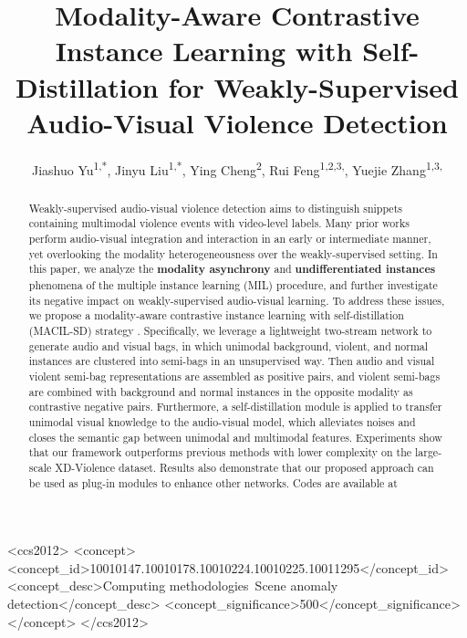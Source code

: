 \documentclass[sigconf]{acmart}
\begin{document}
\title{Modality-Aware Contrastive Instance Learning with Self-Distillation for Weakly-Supervised Audio-Visual Violence Detection}

\author{Jiashuo Yu\textsuperscript{1,*}\authornotemark[1], Jinyu Liu\textsuperscript{1,*}\authornotemark[1], Ying Cheng\textsuperscript{2}, Rui Feng\textsuperscript{1,2,3,}\authornotemark[2], Yuejie Zhang\textsuperscript{1,3,}\authornotemark[2]}



\begin{abstract}
Weakly-supervised audio-visual violence detection aims to distinguish snippets containing multimodal violence events with video-level labels. Many prior works perform audio-visual integration and interaction in an early or intermediate manner, yet overlooking the modality heterogeneousness over the weakly-supervised setting. In this paper, we analyze the \textbf{modality asynchrony} and \textbf{undifferentiated instances} phenomena of the multiple instance learning (MIL) procedure, and further investigate its negative impact on weakly-supervised audio-visual learning. To address these issues, we propose a modality-aware contrastive instance learning with self-distillation (MACIL-SD) strategy . Specifically, we leverage a lightweight two-stream network to generate audio and visual bags, in which unimodal background, violent, and normal instances are clustered into semi-bags in an unsupervised way. Then audio and visual violent semi-bag representations are assembled as positive pairs, and violent semi-bags are combined with background and normal instances in the opposite modality as contrastive negative pairs. Furthermore, a self-distillation module is applied to transfer unimodal visual knowledge to the audio-visual model, which alleviates noises and closes the semantic gap between unimodal and multimodal features. Experiments show that our framework outperforms previous methods with lower complexity on the large-scale XD-Violence dataset. Results also demonstrate that our proposed approach can be used as plug-in modules to enhance other networks. Codes are available at 
\end{abstract}
\begin{CCSXML}
<ccs2012>
   <concept>
       <concept_id>10010147.10010178.10010224.10010225.10011295</concept_id>
       <concept_desc>Computing methodologies~Scene anomaly detection</concept_desc>
       <concept_significance>500</concept_significance>
       </concept>
 </ccs2012>
\end{CCSXML}
\end{document}
